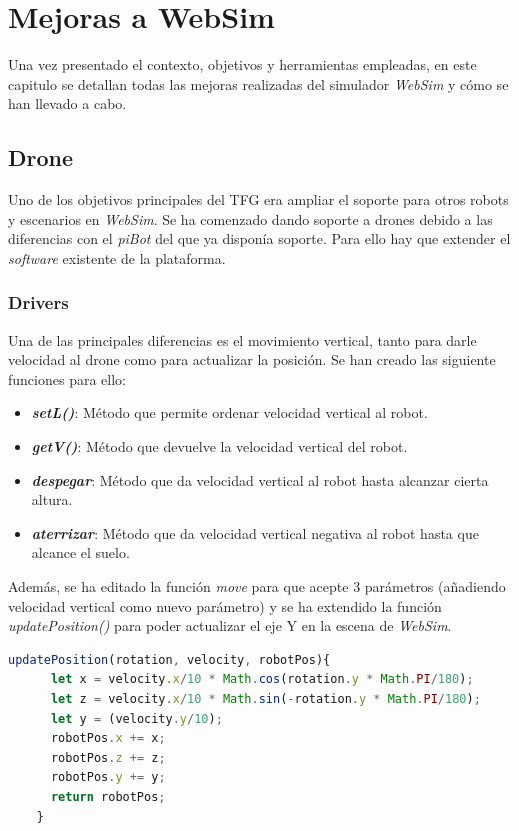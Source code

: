 \chapter{Mejoras a WebSim}
\label{chap:mejoras}
Una vez presentado el contexto, objetivos y herramientas empleadas, en este capitulo se detallan todas las mejoras realizadas del simulador \textit{WebSim} y cómo se han llevado a cabo. 

\section{Drone}
Uno de los objetivos principales del TFG era ampliar el soporte para otros robots y escenarios en \textit{WebSim}. Se ha comenzado dando soporte a drones debido a las diferencias con el \textit{piBot} del que ya disponía soporte. 
Para ello hay que extender el \textit{software} existente de la plataforma.
\subsection{Drivers}
Una de las principales diferencias es el movimiento vertical, tanto para darle velocidad al drone como para actualizar la posición. 
Se han creado las siguiente funciones para ello:
\begin{itemize}
    \item \textit{\textbf{setL()}}: Método que permite ordenar velocidad vertical al robot. 
    \item \textit{\textbf{getV()}}: Método que devuelve la velocidad vertical del robot.
    
    \item \textit{\textit{\textbf{despegar}}}: Método que da velocidad vertical al robot hasta alcanzar cierta altura.
    
    \item \textit{\textbf{aterrizar}}: Método que da velocidad vertical negativa al robot hasta que alcance el suelo. 
\end{itemize}

Además, se ha editado la función \textit{move} para que acepte 3 parámetros (añadiendo velocidad vertical como nuevo parámetro) y se ha extendido la función \textit{updatePosition()} para poder actualizar el eje Y en la escena de \textit{WebSim}.

\begin{lstlisting}[language=javascript, caption=Función para actualizar la posición del robot en el escenario]
    updatePosition(rotation, velocity, robotPos){
      let x = velocity.x/10 * Math.cos(rotation.y * Math.PI/180);
      let z = velocity.x/10 * Math.sin(-rotation.y * Math.PI/180);
      let y = (velocity.y/10);
      robotPos.x += x;
      robotPos.z += z;
      robotPos.y += y;
      return robotPos;
    }
\end{lstlisting}

